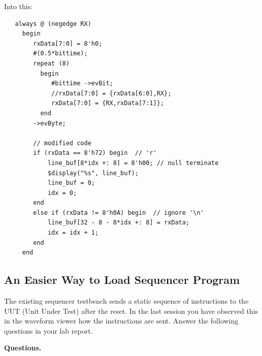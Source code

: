 \documentclass[10pt,letterpaper]{article}
\begin{document}
Into this:\\

\begin{mdframed}
\begin{verbatim}
   always @ (negedge RX)
     begin
        rxData[7:0] = 8'h0;
        #(0.5*bittime);
        repeat (8)
          begin
             #bittime ->evBit;
             //rxData[7:0] = {rxData[6:0],RX};
             rxData[7:0] = {RX,rxData[7:1]};
          end
        ->evByte;

        // modified code
        if (rxData == 8'h72) begin  // 'r'
            line_buf[8*idx +: 8] = 8'h00; // null terminate
            $display("%s", line_buf);
            line_buf = 0;
            idx = 0;
        end
        else if (rxData != 8'h0A) begin  // ignore '\n'
            line_buf[32 - 8 - 8*idx +: 8] = rxData;
            idx = idx + 1;
        end
     end
\end{verbatim}
\end{mdframed}

\subsection{An Easier Way to Load Sequencer Program}

The existing sequencer testbench sends a static sequence of instructions to the UUT (Unit Under Test) after the reset. In the last session you have observed this in the waveform viewer how the instructions are sent. Answer the following questions in your lab report.

\textbf{Questions.}
\end{document}

